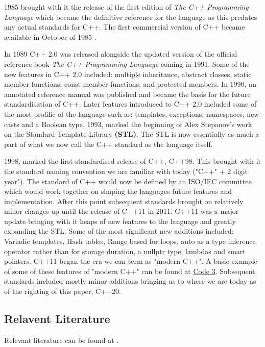 \documentclass[conference, a4paper]{IEEEtran}
\begin{document}
1985 brought with it the release of the first edition of \textit{The C++ Programming Language} \cite{cpp_1985} which became the definitive reference for the language as this predates any actual standards for C++. The first commercial version of C++ became available in October of 1985 \cite{cppinvention}.

In 1989 C++ 2.0 was released alongside the updated version of the official reference book \textit{The C++ Programming Language} coming in 1991. Some of the new features in C++ 2.0 included: multiple inheritance, abstract classes, static member functions, const member functions, and protected members. In 1990, an annotated reference manual was published and became the basis for the future standardisation of C++. Later features introduced to C++ 2.0 included some of the most prolific of the language such as; templates, exceptions, namespaces, new casts and a Boolean type. 1993, marked the beginning of Alex Stepanov's work on the Standard Template Library \textbf{(STL)}. The STL is now essentially as much a part of what we now call the C++ standard as the language itself. 

1998, marked the first standardised release of C++, C++98. This brought with it the standard naming convention we are familiar with today ("C++" + 2 digit year"). The standard of C++ would now be defined by an ISO/IEC committee which would work together on shaping the languages future features and implementation. After this point subsequent standards brought on relatively minor changes up until the release of C++11 in 2011. C++11 was a major update bringing with it heaps of new features to the language and greatly expanding the STL. Some of the most significant new additions included: Variadic templates, Hash tables, Range based for loops, auto as a type inference operator rather than for storage duration, a nullptr type, lambdas and smart pointers. C++11 began the era we can term as "modern C++". A basic example of some of these features of "modern C++" can be found at \hyperref[listing:3]{Code 3}. Subsequent standards included mostly minor additions bringing us to where we are today as of the righting of this paper, C++20.


\subsection{Relavent Literature}
Relevant literature can be found at \cite{cpphome,cpp_1985,cpphistory,cppoverview,cppevolving,josuttis2012c++,alexandrescu2001modern}.
\end{document}
